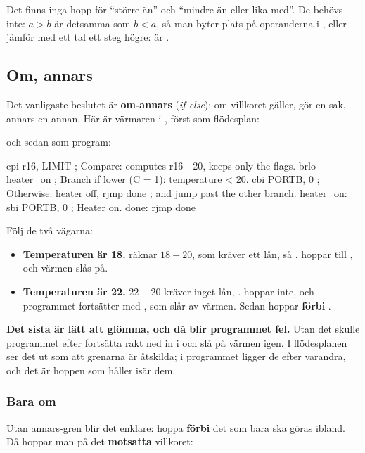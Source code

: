 Det finns inga hopp för \enquote{större än} och \enquote{mindre än eller lika med}. De behövs inte:
$a > b$ är detsamma som $b < a$, så man byter plats på operanderna i , eller jämför med ett
tal ett steg högre:  är .

\subsection{Om, annars}
\label{c9:a5}
Det vanligaste beslutet är \textbf{om-annars} (\emph{if-else}): om villkoret gäller, gör en sak,
annars en annan. Här är värmaren i , först som flödesplan:


\noindent och sedan som program:

\begin{asmcode}
    cpi r16, LIMIT              ; Compare: computes r16 - 20, keeps only the flags.
    brlo heater_on              ; Branch if lower (C = 1): temperature < 20.
    cbi PORTB, 0                ; Otherwise: heater off,
    rjmp done                   ; and jump past the other branch.
heater_on:
    sbi PORTB, 0                ; Heater on.
done:
    rjmp done
\end{asmcode}

\noindent Följ de två vägarna:
\begin{itemize}
  \item \textbf{Temperaturen är 18.}  räknar $18 - 20$, som kräver ett lån, så
    .  hoppar till , och värmen slås på.
  \item \textbf{Temperaturen är 22.} $22 - 20$ kräver inget lån, .  hoppar
    inte, och programmet fortsätter med , som slår av värmen. Sedan hoppar
     \textbf{förbi} .
\end{itemize}

\textbf{Det sista  är lätt att glömma, och då blir programmet fel.} Utan det skulle
programmet efter  fortsätta rakt ned in i  och slå på värmen igen. I
flödesplanen ser det ut som att grenarna är åtskilda; i programmet ligger de efter varandra, och
det är hoppen som håller isär dem.

\subsubsection{Bara om}
Utan annars-gren blir det enklare: hoppa \textbf{förbi} det som bara ska göras ibland. Då hoppar
man på det \textbf{motsatta} villkoret:

